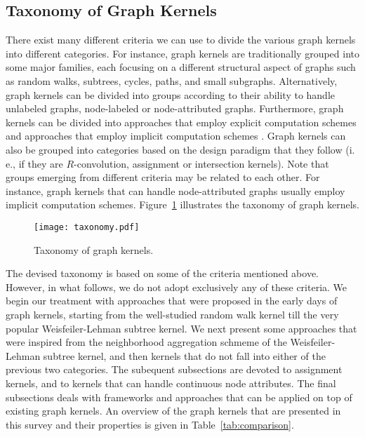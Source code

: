 \documentclass[twoside,11pt]{article}
\newcommand{\ie}{i.\,e., }
\begin{document}
\subsection{Taxonomy of Graph Kernels}
There exist many different criteria we can use to divide the various graph kernels into different categories.
For instance, graph kernels are traditionally grouped into some major families, each focusing on a different structural aspect of graphs such as random walks, subtrees, cycles, paths, and small subgraphs.
Alternatively, graph kernels can be divided into groups according to their ability to handle unlabeled graphs, node-labeled or node-attributed graphs.
Furthermore, graph kernels can be divided into approaches that employ explicit computation schemes and approaches that employ implicit computation schemes .
Graph kernels can also be grouped into categories based on the design paradigm that they follow (\ie if they are $R$-convolution, assignment or intersection kernels).
Note that groups emerging from different criteria may be related to each other.
For instance, graph kernels that can handle node-attributed graphs usually employ implicit computation schemes.
Figure~\ref{fig:taxonomy} illustrates the taxonomy of graph kernels.
\begin{figure}[t]
    \centering
    \texttt{[image: taxonomy.pdf]}
    \caption{Taxonomy of graph kernels.}
    \label{fig:taxonomy}
\end{figure}
The devised taxonomy is based on some of the criteria mentioned above. 
However, in what follows, we do not adopt exclusively any of these criteria.
We begin our treatment with approaches that were proposed in the early days of graph kernels, starting from the well-studied random walk kernel till the very popular Weisfeiler-Lehman subtree kernel.
We next present some approaches that were inspired from the neighborhood aggregation schmeme of the Weisfeiler-Lehman subtree kernel, and then kernels that do not fall into either of the previous two categories.
The subequent subsections are devoted to assignment kernels, and to kernels that can handle continuous node attributes.
The final subsections deals with frameworks and approaches that can be applied on top of existing graph kernels.
An overview of the graph kernels that are presented in this survey and their properties is given in Table~\ref{tab:comparison}.
\end{document}
